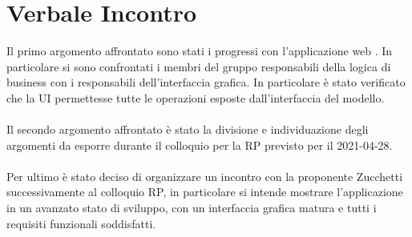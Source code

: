 \section{Verbale Incontro}
Il primo argomento affrontato sono stati i progressi con l'applicazione web \hd . In particolare si sono confrontati i membri del gruppo responsabili della logica di business con i responsabili dell'interfaccia grafica. In particolare è stato verificato che la UI permettesse tutte le operazioni esposte dall'interfaccia del modello. \\ \\
\noindent Il secondo argomento affrontato è stato la divisione e individuazione degli argomenti da esporre durante il colloquio per la RP previsto per il 2021-04-28. \\ \\
\noindent Per ultimo è stato deciso di organizzare un incontro con la proponente Zucchetti successivamente al colloquio RP, in particolare si intende mostrare l'applicazione in un avanzato stato di sviluppo, con un interfaccia grafica matura e tutti i requisiti funzionali soddisfatti.